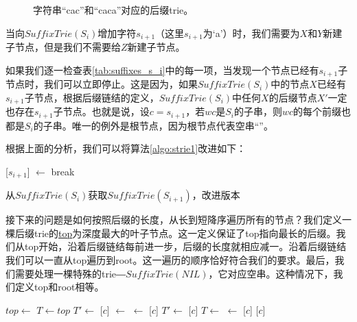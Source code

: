\documentclass[UTF8]{article}
\begin{document}
\begin{figure}[htbp]
  \centering
  \caption{字符串“cac”和“caca”对应的后缀trie。}
  \label{fig:strie-cac}
\end{figure}

当向$SuffixTrie(S_i)$增加字符$s_{i+1}$（这里$s_{i+1}$为‘a’）时，我们需要为$X$和$Y$新建子节点，但是我们不需要给$Z$新建子节点。

如果我们逐一检查表\ref{tab:suffixes_s_i}中的每一项，当发现一个节点已经有$s_{i+1}$子节点时，我们可以立即停止。这是因为，如果$SuffixTrie(S_i)$中的节点$X$已经有$s_{i+1}$子节点，根据后缀链结的定义，$SuffixTrie(S_i)$中任何$X$的后缀节点$X'$一定也存在$s_{i+1}$子节点。也就是说，设$c=s_{i+1}$，若$wc$是$S_i$的子串，则$wc$的每个前缀也都是$S_i$的子串\cite{ukkonen95}。唯一的例外是根节点，因为根节点代表空串“”。

根据上面的分析，我们可以将算法\ref{algo:strie1}改进如下：

\begin{algorithm}
  \begin{algorithmic}[1]
      \State {}[$s_{i+1}$] $\gets$ 
    \Else
      \State break
    \EndIf
  \EndFor
  \end{algorithmic}
  \caption{从$SuffixTrie(S_i)$获取$SuffixTrie(S_{i+1})$，改进版本}
  \label{algo:strie2}
\end{algorithm}

接下来的问题是如何按照后缀的长度，从长到短降序遍历所有的节点？我们定义一棵后缀trie的\underline{top}为深度最大的叶子节点。这一定义保证了top指向最长的后缀。我们从top开始，沿着后缀链结每前进一步，后缀的长度就相应减一。沿着后缀链结我们可以一直从top遍历到root。这一遍历的顺序恰好符合我们的要求。最后，我们需要处理一棵特殊的trie―$SuffixTrie(NIL)$，它对应空串。这种情况下，我们定义top和root相等。

\begin{algorithmic}
   
    \State $top \gets$ 
  \EndIf
  \State $T \gets top$
  \State $T' \gets$  
    \State {}[$c$] $\gets$ 
    \State {} $\gets$ [$c$]
    \State $T' \gets$ [$c$]
    \State $T \gets$ 
  \EndWhile
    \State {} $\gets$ [$c$]
  \EndIf
  \State \Return {}[$c$] 
\EndFunction
\end{algorithmic}
\end{document}

